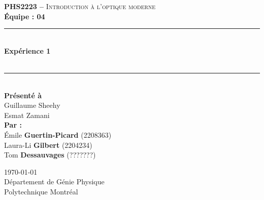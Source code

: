 \documentclass[11pt,letterpaper]{article}
\begin{document}
\begin{titlepage}
\center

\begin{figure}
\end{figure}
\vspace*{2 cm}

\textsc{\Large \textbf{PHS2223 --} Introduction à l'optique moderne}\\[0.5cm]
\large{\textbf{Équipe : 04}}\\[1.5cm]

\rule{\linewidth}{0.5mm} \\[0.5cm]
\Large{\textbf{Expérience 1}} \\[0.2cm]
\\
\rule{\linewidth}{0.2mm} \\[2.3cm]

\large{\textbf{Présenté à}\\
  Guillaume Sheehy\\
  Esmat Zamani\\[2.5cm]
  \textbf{Par :}\\
  Émile \textbf{Guertin-Picard} (2208363)\\
  Laura-Li \textbf{Gilbert} (2204234)\\
  Tom \textbf{Dessauvages} (???????)\\[3cm]}

\large{\today\\
Département de Génie Physique\\
Polytechnique Montréal\\}

\end{titlepage}


\tableofcontents
{}
\newpage

\pagestyle{fancy}
\setlength{\headheight}{14pt}
\renewcommand{\headrulewidth}{0pt}
\fancyfoot[R]{\thepage}

\pagestyle{fancy}
\fancyhf{}
\renewcommand{\headrulewidth}{1pt}
\fancyhead[R]{\today}
\fancyfoot[R]{\thepage}

\setcounter{page}{1}

\end{document}
